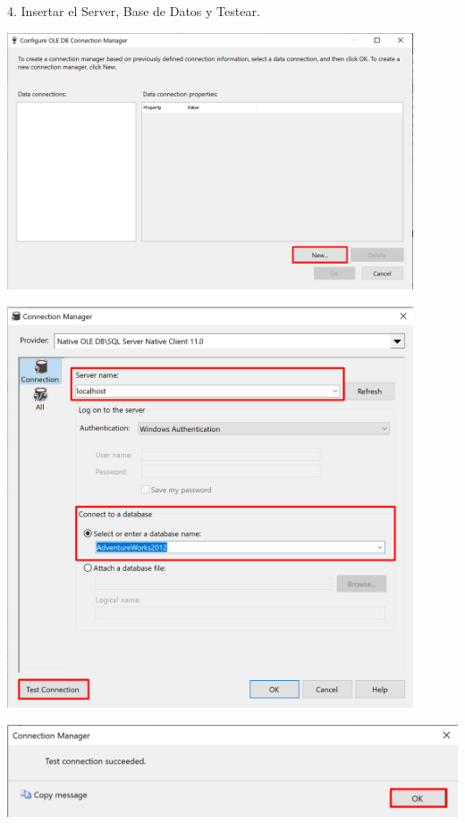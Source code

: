 \documentclass[12pt,letterpaper]{article}
\begin{document}
4. Insertar el Server, Base de Datos y Testear.
	\begin{center}
	\includegraphics[width=12cm]{./img/22}
	\end{center}
	\begin{center}
		\includegraphics[width=12cm]{./img/23}
	\end{center}
	\begin{center}
		\includegraphics[width=14cm]{./img/24}
	\end{center}
\end{document}
